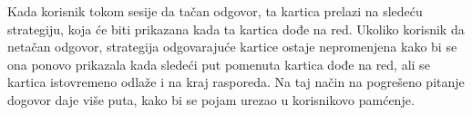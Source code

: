 Kada korisnik tokom sesije da tačan odgovor, ta kartica prelazi na sledeću strategiju, koja će biti prikazana kada ta kartica dođe na red.
Ukoliko korisnik da netačan odgovor, strategija odgovarajuće kartice ostaje nepromenjena kako bi se ona ponovo prikazala kada sledeći put pomenuta kartica dođe na red, ali se kartica istovremeno odlaže i na kraj rasporeda.
Na taj način na pogrešeno pitanje dogovor daje više puta, kako bi se pojam urezao u korisnikovo pamćenje.
